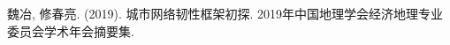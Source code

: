 \begin{thebibliography}{99}
 魏冶, 修春亮. (2019). 城市网络韧性框架初探. 2019年中国地理学会经济地理专业委员会学术年会摘要集.
\end{thebibliography}
